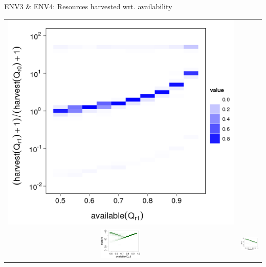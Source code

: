 \documentclass[8pt, handout=show,notes=show]{beamer}
\begin{document}
\begin{frame}{ENV3 \& ENV4: Resources harvested wrt. availability}
\begin{table}[H]
\begin{tabular}{cc}
		\includegraphics[width=\imgSize]{../images/5StaticEnv/medianRatioHM_env4}\\
\includegraphics[width=2cm]{../images/5StaticEnv/AliveHM_env3}&\includegraphics[width=2cm]{../images/5StaticEnv/AliveHM_env4}\\
		\end{tabular}
	\end{table}
\end{frame}
\end{document}
